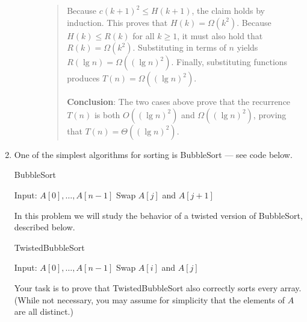 \documentclass[11pt]{article}
\begin{document}
\begin{enumerate}[leftmargin=*]
\begin{enumerate}
\begin{enumerate}
\begin{quote}
        Because $c(k + 1)^2 \leq H(k + 1)$, the claim holds by induction. This proves that $H(k) = \Omega(k^2)$. Because $H(k) \leq R(k)$ for all $k \geq 1$, it must also hold that $R(k) = \Omega(k^2)$. Substituting in terms of $n$ yields $R(\lg n) = \Omega((\lg n)^2)$. Finally, substituting functions produces $T(n) = \Omega((\lg n)^2)$. 


        \medskip
        \textbf{Conclusion}:
        The two cases above prove that the recurrence $T(n)$ is both $O((\lg n)^2)$ and $\Omega((\lg n)^2)$, proving that $T(n) = \Theta((\lg n)^2)$.
        \end{quote}
    \end{enumerate}
\end{enumerate}

\item One of the simplest algorithms for sorting is BubbleSort --- see code below.

\begin{algorithm}
\caption{BubbleSort}
\begin{algorithmic}
\STATE Input: $A[0], \dots, A[n-1]$
            \STATE Swap $A[j]$ and $A[j+1]$
        \ENDIF
    \ENDFOR
\ENDFOR
\end{algorithmic}
\end{algorithm}

In this problem we will study the behavior of a twisted version of BubbleSort, described below.

\begin{algorithm}
\caption{TwistedBubbleSort}
\begin{algorithmic}
\STATE Input: $A[0], \dots, A[n-1]$
            \STATE Swap $A[i]$ and $A[j]$
        \ENDIF
    \ENDFOR
\ENDFOR
\end{algorithmic}
\end{algorithm}

Your task is to prove that TwistedBubbleSort also correctly sorts every array. (While not necessary, you may assume for simplicity that the elements of $A$ are all distinct.)


\end{enumerate}
\end{document}
